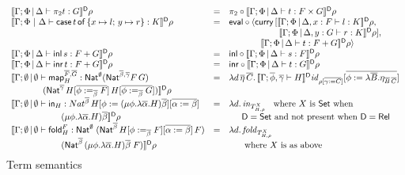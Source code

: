 \documentclass{lmcs}
\theoremstyle{plain}\newtheorem{satz}[thm]{Satz}
\newcommand{\inl}{\mathsf{inl}}
\newcommand{\inr}{\mathsf{inr}}
\newcommand{\fold}{\mathsf{fold}}
\newcommand{\set}{\mathsf{Set}}
\renewcommand{\id}{\mathit{id}}
\newcommand{\map}{\mathsf{map}}
\begin{document}
{\begin{figure*}
\begin{adjustbox}{varwidth=7.2in, max width=5.8in, fbox, center}
\[\begin{array}{lll}
\dsem{\Gamma;\Phi \,|\, \Delta \vdash \pi_2 t : G}\rho & = &
\pi_2 \circ \dsem{\Gamma;\Phi \,|\, \Delta \vdash t : F \times
  G} \rho\\
\dsem{\Gamma;\Phi~|~\Delta \vdash \cse{t}{x \mapsto l}{y \mapsto r} :
  K}\rho & = & \eval \circ \langle \curry \,[\dsem{\Gamma;\Phi
    \,|\, \Delta, x : F \vdash l : K}\rho,\\
   & & \hspace*{0.79in} \dsem{\Gamma;\Phi \,|\, \Delta, y
    : G \vdash r : K}\rho],\\
   & &  \hspace*{0.5in} \dsem{\Gamma;\Phi \,|\, \Delta \vdash t :
  F + G} \rho\rangle\\   
\dsem{\Gamma;\Phi \,|\, \Delta \vdash \inl \,s: F + G} \rho& = &
\inl \circ \dsem{\Gamma;\Phi \,|\, \Delta \vdash s: F}\rho\\
\dsem{\Gamma;\Phi \,|\, \Delta \vdash \inr \,t: F + G}\rho & = & 
\inr \circ \dsem{\Gamma;\Phi \,|\, \Delta \vdash t : G}\rho\\
\llbracket \Gamma;\emptyset \,|\, \emptyset \vdash \map^{\ol{F},\ol{G}}_H
  : \Nat^\emptyset (\Nat^{\ol\beta,\ol\gamma} F\,G)
& = & \lambda d\, \ol\eta\,\ol{C}.\,
\dsem{\Gamma; \ol{\phi},\ol{\gamma}\vdash H}\id_{\rho[\ol{\gamma:=
      C}]}[\ol{\phi := \lambda \ol B. \eta_{\ol B\, \ol C}}]\\ 
\hspace*{0.5in}
  (\Nat^{\ol{\gamma}}\,H[\ol{\phi :=_{\ol{\beta}} F}]\,H[\ol{\phi
      :=_{\ol{\beta}} G}]) \rrbracket^{\mathsf D} \rho & &\\
\llbracket \Gamma;\emptyset \,|\, \emptyset \vdash \tin_H :
Nat^{\ol{\beta}} \, H[\phi := (\mu \phi.\lambda {\overline
    \alpha}.H){\overline \beta}][\ol{\alpha := \beta}] & = &
\lambda
d.\,\mathit{in}_{{T}^X_{H,\rho}} \;\;\mbox{ where } X \mbox{ is } \set \mbox{ when } \\ 
\hspace*{0.79in}(\mu \phi.\lambda {\overline \alpha}.H){\overline
  \beta} \rrbracket^{\mathsf{D}} \rho & & \hspace*{0.2in}  
\mathsf{D} = \set \mbox{ and not present when }
\mathsf{D} = \rel\\  
\llbracket \Gamma;\emptyset \,|\, \emptyset \vdash
  \fold^F_H : \Nat^\emptyset\;(\Nat^{\ol{\beta}}\,H[\phi
    :=_{\ol{\beta}} F][\ol{\alpha := \beta}]\,F) & = &  
\lambda d. \,\mathit{fold}_{T^X_{H,\rho}} \\ 
\hspace*{0.79in}(\Nat^{{\ol{\beta}} }\,(\mu
  \phi.\lambda \overline \alpha.H)\overline \beta\;F)
\rrbracket^{\mathsf{D}} \rho & & \hspace*{0.2in} \mbox{ where } X \mbox{ is as above
}\vspace*{-0.1in} 
\end{array}\]
\caption{Term semantics}\label{fig:term-sem} 
\end{adjustbox}\vspace*{-0.05in}
\end{figure*}

}
\end{document}
